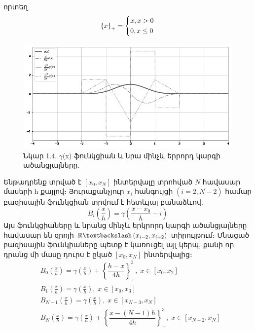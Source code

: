 \documentclass[fleqn, bachelor,subf,12pt,notitlepage]{article}
\begin{document}
որտեղ
\begin{equation}
\left\{x\right\}_{+}=
\begin{dcases}
x, x > 0 \\
0, x \leq 0	
\end{dcases}
\end{equation}
\begin{figure}[H]
\centering
\includegraphics[width=1.0\textwidth]{images/cubic_compact_support_basis}
\captionsetup{labelformat=empty}
\caption{Նկար 1.4. $\gamma$(x) ֆունկցիան և նրա մինչև երրորդ կարգի ածանցյալները.}
\end{figure}
Ենթադրենք տրված է $\left[x_{0}, x_{N}\right]$ ինտերվալը տրոհված $N$ հավասար մասերի h քայլով։ Յուրաքանչյուր $x_{i}$ հանգույցի $(i=\overline{2, N-2})$ համար բազիսային ֆունկցիան տրվում է հետևյալ բանաձևով.
\begin{equation}
B_{i}\left(\dfrac{x}{h}\right)=\gamma \left(\frac{x-x_{0}}{h}-i\right)
\end{equation}
Այս ֆունկցիաները և նրանց մինչև երկրորդ կարգի ածանցյալները հավասար են զրոյի $\mathbb{R} \textbackslash \left(x_{i-2}, x_{i+2}\right)$ տիրույթում։
Մնացած բազիսային ֆունկիաները պետք է կառուցել այլ կերպ, քանի որ դրանց մի մասը դուրս է ըկած  $\left[x_{0}, x_{N}\right]$ ինտերվալից։
\begin{equation}
\begin{aligned}
&B_{0}\left(\frac{x}{h}\right) = \gamma \left(\frac{x}{h}\right) + \left\{\dfrac{h - x}{4h}\right\}^{3}_{+} , \; x \in \left[x_{0}, x_{2}\right] \\
&B_{1}\left(\frac{x}{h}\right) = \gamma \left(\frac{x}{h}\right), \; x \in \left[x_{0}, x_{3}\right]\\
&B_{N-1}\left(\frac{x}{h}\right) = \gamma \left(\frac{x}{h}\right), \; x \in \left[x_{N-3}, x_{N}\right] \\
&B_{N}\left(\frac{x}{h}\right) = \gamma \left(\frac{x}{h}\right) + \left\{\dfrac{x - (N-1)h}{4h}\right\}^{3}_{+} , \; x \in \left[x_{N-2}, x_{N}\right]
\end{aligned}
\end{equation}
\end{document}
